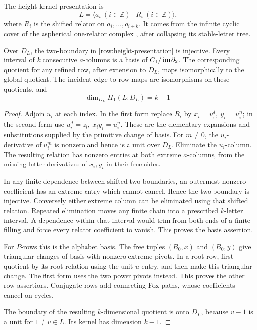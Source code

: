 The height-kernel presentation is
\begin{equation}\label{row:height-presentation}
 L=\langle a_i\ (i\in\mathbb Z)\mid R_i\ (i\in\mathbb Z)\rangle,
\end{equation}
where \(R_i\) is the shifted relator on \(a_i,\ldots,a_{i+k}\).
It comes from the infinite cyclic cover of the aspherical one-relator
complex \cite{Lyndon1950}, after collapsing its stable-letter tree.

\begin{lemma}\label{row:level-basis}
Over \(D_L\), the two-boundary in
\eqref{row:height-presentation} is injective. Every interval of \(k\)
consecutive \(a\)-columns is a basis of \(C_1/\operatorname{im}\partial_2\).
The corresponding quotient for any refined row, after extension to
\(D_L\), maps isomorphically to the global quotient. The incident
edge-to-row maps are isomorphisms on these quotients, and
\[
 \dim_{D_L}H_1(L;D_L)=k-1.
\]
\end{lemma}

\begin{proof}
Adjoin \(u_i\) at each index. In the first form replace \(R_i\) by
\(x_i=u_i^d,\ y_i=u_i^n\); in the second form use
\(u_i^d=z_i,\ x_iy_i=u_i^n\).
These are the elementary expansions and substitutions supplied by
the primitive change of basis. For \(m\neq0\), the \(u_i\)-derivative
of \(u_i^m\) is nonzero and hence is a unit over \(D_L\).
Eliminate the \(u_i\)-column. The resulting relation has nonzero
entries at both extreme \(a\)-columns, from the missing-letter
derivatives of \(x_i,y_i\) in their free sides.

In any finite dependence between shifted two-boundaries, an
outermost nonzero coefficient has an extreme entry which cannot
cancel. Hence the two-boundary is injective. Conversely either
extreme column can be eliminated using that shifted relation.
Repeated elimination moves any finite chain into a prescribed
\(k\)-letter interval. A dependence within that interval would trim
from both ends of a finite filling and force every relator coefficient
to vanish. This proves the basis assertion.

For \(P\)-rows this is the alphabet basis. The free tuples
\((B_0,x)\) and \((B_0,y)\) give triangular changes of basis with
nonzero extreme pivots. In a root row, first quotient by its root
relation using the unit \(u\)-entry, and then make this triangular
change. The first form uses the two power pivots instead. This proves
the other row assertions. Conjugate rows add connecting Fox paths,
whose coefficients cancel on cycles.

The boundary of the resulting \(k\)-dimensional quotient is onto
\(D_L\), because \(v-1\) is a unit for \(1\neq v\in L\).
Its kernel has dimension \(k-1\).
\end{proof}


